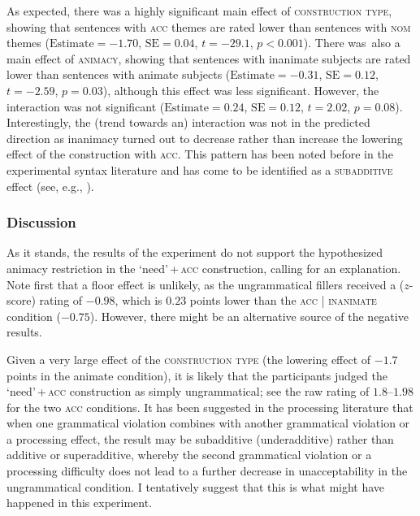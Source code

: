 \documentclass[output=paper]{langscibook}
\begin{document}
As expected, there was a highly significant main effect of \textsc{construction type}, showing that sentences with \textsc{acc} themes are rated lower than sentences with \textsc{nom} themes ($\text{Estimate} = -1.70$, $\text{SE} = 0.04$, $t = -29.1$, $p < 0.001$). There was~also a main effect of \textsc{animacy}, showing that sentences with inanimate subjects are rated lower than sentences with animate subjects ($\text{Estimate} = -0.31$, $\text{SE} = 0.12$,  $t = -2.59$, $p = 0.03$), although this effect was less significant. However, the interaction was not significant ($\text{Estimate} = 0.24$, $\text{SE} = 0.12$, $t = 2.02$, $p = 0.08$). Interestingly, the (trend towards an) interaction was not in the predicted direction as inanimacy turned out to decrease rather than increase the lowering effect of the construction with \textsc{acc}. This pattern has been noted before in the experimental syntax literature and has come to be identified as a \textsc{subadditive} effect (see, e.g., \citealt{Stepanov.Music.Stateva2018}).

\subsubsection{Discussion}

As it stands, the results of the experiment do not support the hypothesized animacy restriction in the `need'\,+\,\textsc{acc} construction, calling for an explanation. Note first that a floor effect is unlikely, as the ungrammatical fillers received a ($z$-score) rating of $-0.98$, which is $0.23$ points lower than the \textsc{acc} | \textsc{inanimate} condition ($-0.75$). However, there might be an alternative source of the negative results.

Given a very large effect of the \textsc{construction type} (the lowering effect of $-1.7$ points in the animate condition), it is likely that the participants judged the `need'\,+\,\textsc{acc} construction as simply ungrammatical; see the raw rating of $1.8$--$1.98$ for the two \textsc{acc} conditions. It has been suggested in the processing literature \citep[see][]{Hofmeister.Casasanto.Staum.Sag2014} that when one grammatical violation combines with another grammatical violation or a processing effect, the result may be subadditive (underadditive) rather than additive or superadditive, whereby the second grammatical violation or a processing difficulty does not lead to a further decrease in unacceptability in the ungrammatical condition. I tentatively suggest that this is what might have happened in this experiment.
\end{document}
